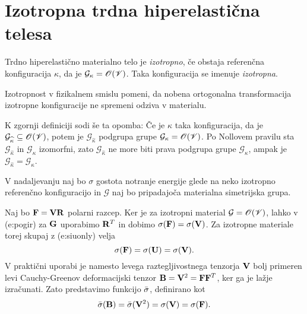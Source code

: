 \section{Izotropna trdna hiperelastična telesa}


\begin{definicija}
	Trdno hiperelastično materialno telo je \emph{izotropno}, če obstaja referenčna
	konfiguracija $\kappa$, da je $\mathcal{G}_{\kappa}=\mathscr{O}(\mathscr V)$. Taka konfiguracija
	se imenuje \emph{izotropna}.
\end{definicija}

Izotropnost v fizikalnem smislu pomeni, da nobena ortogonalna transformacija izotropne
konfiguracije ne spremeni odziva v materialu.

K zgornji definiciji sodi še ta opomba: Če je $\widehat{\kappa}$ taka konfiguracija, da je
$\mathcal{G}_{\widehat{\kappa}}\subseteq\mathscr{O}(\mathscr V)$, potem je $\mathcal{G}_{\widehat{\kappa}}$
podgrupa grupe $\mathcal{G}_{\kappa}=\mathscr{O}(\mathscr V)$. Po Nollovem pravilu sta
$\mathcal{G}_{\widehat{\kappa}}$ in $\mathcal{G}_{\kappa}$ izomorfni, zato $\mathcal{G}_{\widehat{\kappa}}$
ne more biti prava podgrupa grupe $\mathcal{G}_{\kappa}$, ampak je
$\mathcal{G}_{\widehat{\kappa}}=\mathcal{G}_{\kappa}$.

V nadaljevanju naj bo $\sigma$ gostota notranje energije glede na neko izotropno referenčno konfiguracijo
in $\mathcal{G}$ naj bo pripadajoča materialna simetrijska grupa.

Naj bo $\mathbf F=\mathbf V\mathbf R$ polarni razcep. Ker je za izotropni material $\mathcal{G}=\mathscr{O}(\mathscr V)$,
lahko v ({e:pogir}) za $\mathbf G$ uporabimo $\mathbf R^T$ in dobimo $\sigma(\mathbf F)=\sigma(\mathbf V)$.
Za izotropne materiale torej skupaj z ({e:siuonly}) velja
\[
	\sigma(\mathbf F)=\sigma(\mathbf U)=\sigma(\mathbf V).
\]
V praktični uporabi je namesto levega raztegljivostnega tenzorja $\mathbf V$ bolj primeren
levi Cauchy-Greenov deformacijski tenzor $\mathbf B=\mathbf V^2=\mathbf F\mathbf F^T$, ker
ga je lažje izračunati. Zato predstavimo funkcijo $\bar{\sigma}$, definirano kot
\begin{equation*} %
	\bar{\sigma}(\ten{B})=\bar{\sigma}(\ten{V}^2)=\sigma(\ten{V})=\sigma(\ten{F}).
\end{equation*}


